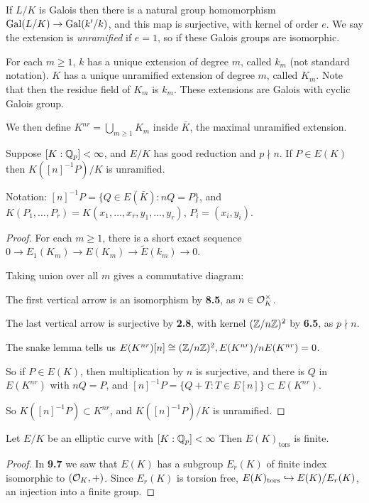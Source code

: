 \documentclass[10pt,a4paper]{article}
\begin{document}
If $L/K$ is Galois then there is a natural group homomorphism $\operatorname{Gal}(L/K) \to \operatorname{Gal}(k'/k)$, and this map is surjective, with kernel of order $e$. We say the extension is \emph{unramified} if $e=1$, so if these Galois groups are isomorphic.

For each $m \geq 1$, $k$ has a unique extension of degree $m$, called $k_m$ (not standard notation). $K$ has a unique unramified extension of degree $m$, called $K_m$. Note that then the residue field of $K_m$ is $k_m$. These extensions are Galois with cyclic Galois group.

We then define $K^{nr} = \bigcup_{m\geq 1} K_m$ inside $\bar{K}$, the maximal unramified extension.

\begin{theorem}
  Suppose $[K:\mathbb{Q}_p] < \infty$, and $E/K$ has good reduction and $p\nmid n$. If $P \in E(K)$ then $K([n]^{-1}P)/K$ is unramified.
\end{theorem}
Notation: $[n]^{-1}P = \{Q \in E(\bar{K}) : nQ = P\}$, and $K(P_1, \ldots, P_r) = K(x_1, \ldots, x_r, y_1, \ldots, y_r)$, $P_i = (x_i, y_i)$.

\begin{proof}
  For each $m \geq 1$, there is a short exact sequence $0\to E_1(K_m) \to E(K_m) \to \tilde{E}(k_m) \to 0$.

  Taking union over all $m$ gives a commutative diagram:
  \begin{center}
  \end{center}
  The first vertical arrow is an isomorphism by \textbf{8.5}, as $n \in \mathcal{O}_K^\times$.

  The last vertical arrow is surjective by \textbf{2.8}, with kernel $(\mathbb{Z}/n\mathbb{Z})^2$ by \textbf{6.5}, as $p \nmid n$.

  The snake lemma tells us $E(K^{nr})[n]\cong (\mathbb{Z}/n\mathbb{Z})^2, E(K^{nr})/nE(K^{nr}) = 0$.

  So if $P \in E(K)$, then multiplication by $n$ is surjective, and there is $Q$ in $E(K^{nr})$ with $nQ = P$, and $[n]^{-1}P = \{Q+T:T\in E[n]\} \subset E(K^{nr})$.

  So $K([n]^{-1}P) \subset K^{nr}$, and $K([n]^{-1}P)/K$ is unramified.
\end{proof}
\begin{corollary}
  Let $E/K$ be an elliptic curve with $[K:\mathbb{Q}_p]<\infty$ Then $E(K)_{\text{tors}}$ is finite.
\end{corollary}
\begin{proof}
  In \textbf{9.7} we saw that $E(K)$ has a subgroup $E_r(K)$ of finite index isomorphic to $(\mathcal{O}_K, +)$. Since $E_r(K)$ is torsion free, $E(K)_{\text{tors}}\hookrightarrow E(K)/E_r(K)$, an injection into a finite group.
\end{proof}
\end{document}
